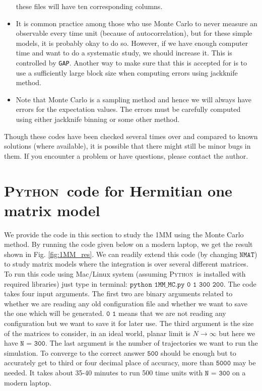 \documentclass[11pt]{article}
\newcommand{\PY}{\textsc{Python}}
\begin{document}
\begin{itemize}
these files will have ten corresponding columns. 
\item It is common practice among those who use Monte Carlo to never measure an 
observable every time unit (because of autocorrelation), but for these simple models, it is probably okay to do so. However, if we
have enough computer time and want to do a systematic study, we should increase it. This is controlled by \texttt{GAP}. Another way to make sure that this is accepted for is to use a sufficiently large block size when computing errors using jackknife method. 
\item Note that Monte Carlo is a sampling method and hence we will always have errors for the expectation values. The errors must be carefully computed using either jackknife binning or some other method. 
\end{itemize} 
Though these codes have been checked several times over and compared to known solutions (where available), it is possible that there might still be minor bugs in them. If you encounter a problem or have questions, please contact the author. 


\vspace{18mm}
\section{\label{sec:1MMPYC}\PY~code for Hermitian one matrix model}
We provide the code in this section to study the 1MM using the Monte Carlo method. By running the code given below
on a modern laptop, we get the result shown in 
Fig. \ref{fig:1MM_res}. We can readily extend this code (by changing $\texttt{NMAT}$) to study matrix models where the integration is over several different matrices. 
To run this code using Mac/Linux system (assuming  \PY~is installed with required libraries) just type in terminal: 
$\texttt{python 1MM\_MC.py 0 1 300 200}$. The code takes four input arguments. The first two are binary arguments
related to whether we are reading any old configuration file and whether we want to save the one which will be 
generated. $\texttt{0 1}$ means that we are not reading any configuration but we want to save it for later use. 
The third argument is the size of the matrices to consider, in an ideal world, planar limit is $ N \to \infty$ but here
we have $\texttt{N = 300}$. The last argument is the 
number of trajectories we want to run the simulation. 
To converge to the correct answer $\texttt{500}$ should be enough but to accurately 
get to third or four decimal place of accuracy, 
more than $\texttt{5000}$ may be needed. 
It takes about 35-40 minutes to run 500 time units 
with $\texttt{N = 300}$ on a modern laptop. 
\end{document}
